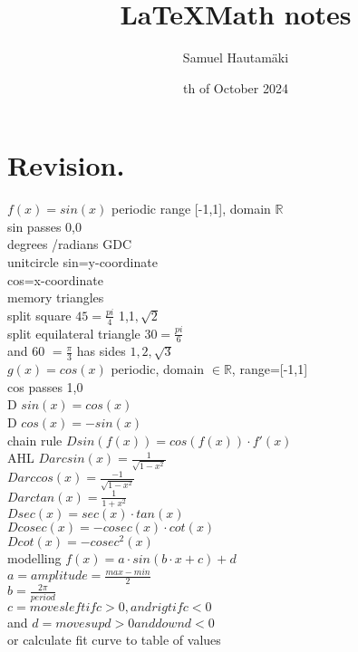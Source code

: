 \documentclass{article}
\title{\LaTeX Math notes}
\author{Samuel Hautamäki}
\date{th of October 2024}
\begin{document}
  \maketitle
   
  \section{Revision.}
  $f(x)=sin(x)$ periodic range [-1,1], domain $\mathbb{R}$\\
  sin passes 0,0\\
  degrees /radians GDC\\
  unitcircle sin=y-coordinate\\
  cos=x-coordinate\\
  memory triangles\\
  split square $45=\frac{pi}{4}$ 1,1$,\sqrt{2}$\\
  split equilateral triangle $30=\frac{pi}{6}$\\
  and 60 $=\frac{\pi}{3}$ has sides $1,2,\sqrt{3}$\\
  $g (x)=cos(x)$ periodic, domain $\in\mathbb{R}$, range=[-1,1]\\
  cos passes 1,0\\
  D $sin(x)=cos(x)$\\
  D $cos(x)=-sin(x)$\\
  chain rule $D sin(f(x))=cos(f(x))\cdot f'(x)$\\
  AHL $D arcsin (x)=\frac{1}{\sqrt{1-x^2}}$\\
  $D arccos(x)=\frac{-1}{\sqrt{1-x^2}}$\\
  $D arctan(x)=\frac{1}{1+x^2}$\\
  $D sec(x)=sec(x)\cdot tan(x)$\\
  $D cosec(x)=-cosec(x)\cdot cot(x)$\\
  $D cot(x)=-cosec^2(x)$\\
  modelling $f(x)=a\cdot sin(b\cdot x+c)+d$\\
  $a=amplitude=\frac{max-min}{2}$\\
  $b=\frac{2\pi}{period}$\\
  $c=moves left if c>0, and rigt if c<0$\\
  and $d=moves up d>0 and down d<0$\\
  or calculate fit curve to table of values
\end{document}
